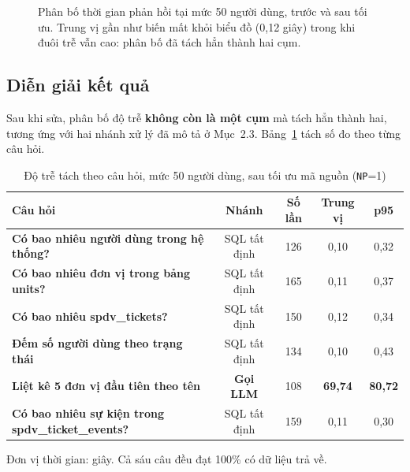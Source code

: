 \documentclass[12pt,a4paper]{article}
\newcommand{\bad}[1]{\textcolor{dangerred}{\bfseries #1}}
\begin{document}
\begin{figure}[H]
\centering
{}
\caption{Phân bố thời gian phản hồi tại mức 50 người dùng, trước và sau tối ưu.
Trung vị gần như biến mất khỏi biểu đồ (0,12 giây) trong khi đuôi trễ vẫn cao:
phân bố đã tách hẳn thành hai cụm.}
\label{fig:sosanh}
\end{figure}

\subsection{Diễn giải kết quả}

Sau khi sửa, phân bố độ trễ \textbf{không còn là một cụm} mà tách hẳn thành hai,
tương ứng với hai nhánh xử lý đã mô tả ở Mục~2.3. Bảng~\ref{tab:theocauhoi} tách
số đo theo từng câu hỏi.

\begin{table}[H]
\centering
\caption{Độ trễ tách theo câu hỏi, mức 50 người dùng, sau tối ưu mã nguồn
(\texttt{NP}=1)}
\label{tab:theocauhoi}
\begin{tabularx}{\textwidth}{>{\bfseries}Xcccc}
\toprule
\rowcolor{lightblue}
Câu hỏi & Nhánh & Số lần & Trung vị & p95\\
\midrule
Có bao nhiêu người dùng trong hệ thống? & SQL tất định & 126 & 0,10 & 0,32\\
Có bao nhiêu đơn vị trong bảng units?   & SQL tất định & 165 & 0,11 & 0,37\\
Có bao nhiêu spdv\_tickets?             & SQL tất định & 150 & 0,12 & 0,34\\
Đếm số người dùng theo trạng thái       & SQL tất định & 134 & 0,10 & 0,43\\
Liệt kê 5 đơn vị đầu tiên theo tên      & \bad{Gọi LLM} & 108 & \bad{69,74} & \bad{80,72}\\
Có bao nhiêu sự kiện trong spdv\_ticket\_events? & SQL tất định & 159 & 0,11 & 0,30\\
\bottomrule
\end{tabularx}

\vspace{0.15cm}
{\small Đơn vị thời gian: giây. Cả sáu câu đều đạt 100\% có dữ liệu trả về.}
\end{table}
\end{document}
